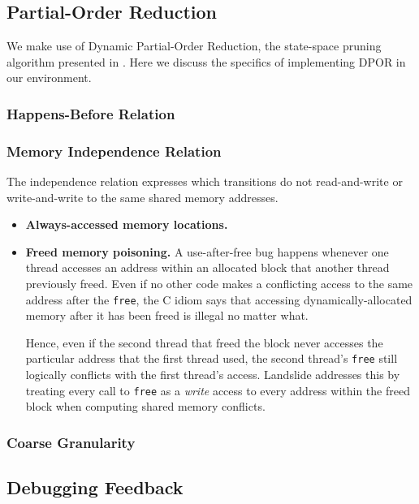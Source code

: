 \subsection{Partial-Order Reduction}
\label{sec:techniques-por}

We make use of Dynamic Partial-Order Reduction, the state-space pruning algorithm presented in \cite{dpor}. Here we discuss the specifics of implementing DPOR in our environment.

\subsubsection{Happens-Before Relation}

\subsubsection{Memory Independence Relation}
\label{sec:por-independence}
The independence relation expresses which transitions do not read-and-write or write-and-write to the same shared memory addresses.

\begin{itemize}
	\item {\bf Always-accessed memory locations.} %
	\item {\bf Freed memory poisoning.}
		A use-after-free bug happens whenever one thread accesses an address within an allocated block that another thread previously freed. Even if no other code makes a conflicting access to the same address after the \texttt{free}, the C idiom says that accessing dynamically-allocated memory after it has been freed is illegal no matter what.

		Hence, even if the second thread that freed the block never accesses the particular address that the first thread used, the second thread's \texttt{free} still logically conflicts with the first thread's access. Landslide addresses this by treating every call to \texttt{free} as a {\em write} access to every address within the freed block when computing shared memory conflicts.
\end{itemize}

\subsubsection{Coarse Granularity}

\subsection{Debugging Feedback}

